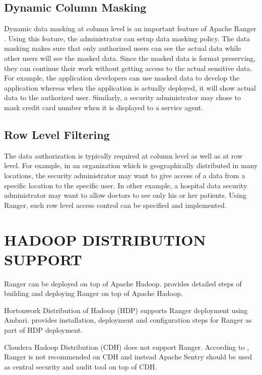 \documentclass[9pt,twocolumn,twoside]{../../styles/osajnl}
\begin{document}
\subsection{Dynamic Column Masking}
Dynamic data masking at column level is an important feature of Apache Ranger
. Using this feature, the administrator can setup data masking policy. The
data masking makes sure that only authorized users can see the actual data
while other users will see the masked data. Since the masked data is format
preserving, they can continue their work without getting access to the actual
 sensitive data. For example, the application developers can use masked data
 to develop the application whereas when the application is actually
 deployed, it will show actual data to the authorized user. Similarly, a
 security administrator may chose to mask credit card number when it is
 displayed to a service agent.

\subsection{Row Level Filtering}
The data authorization is typically required at column level as well as at row
level. For example, in an organization which is geographically distributed in
 many locations, the security administrator may want to give access of a data
  from a specific location to the specific user. In other example, a
  hospital data security administrator may want to allow doctors to see
  only his or her patients. Using Ranger, such row level access control can
  be specified and implemented.

  \section{HADOOP DISTRIBUTION SUPPORT}

  
Ranger can be deployed on top of Apache Hadoop.
\cite{www-ranger-on-apache-hadoop} provides detailed steps of building and
deploying Ranger on top of Apache Hadoop.

Hortonwork Distribution of Hadoop (HDP) supports Ranger deployment using
Ambari. \cite{www-ranger-on-hdp} provides installation, deployment and
configuration steps for Ranger as part of HDP deployment.

Cloudera Hadoop Distribution (CDH) does not support Ranger. According to
\cite{www-ranger-on-cdh}, Ranger is not recommended on CDH and instead Apache
Sentry should be used as central security and audit tool on top of CDH.
\end{document}
